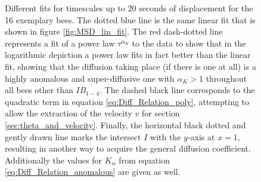 \begin{figure}%
    \centering
    \caption{Different fits for timescales up to $20$ seconds of displacement for the 16 exemplary bees. The dotted blue line is the same linear fit that is shown in figure \ref{fig:MSD_lin_fit}. The red dash-dotted line represents a fit of a power law $\tau^{\alpha_{K}}$ to the data to show that in the logarithmic depiction a power law fits in fact better than the linear fit, showing that the diffusion taking place (if there is one at all) is a highly anomalous and super-diffusive one with $\alpha_{K}>1$ throughout all bees other than $IB_{1-4}$. The dashed black line corresponds to the quadratic term in equation \ref{eq:Diff_Relation_poly}, attempting to allow the extraction of the velocity $v$ for section \ref{sec:theta_and_velocity}. Finally, the horizontal black dotted and gently drawn line marks the intersect $I$ with the $y$-axis at $x=1$, resulting in another way to acquire the general diffusion coefficient. Additionally the values for $K_{\alpha}$ from equation \ref{eq:Diff_Relation_anomalous} are given as well.}
    \label{fig:Lin_Poly_Exp_fit}
\end{figure}

